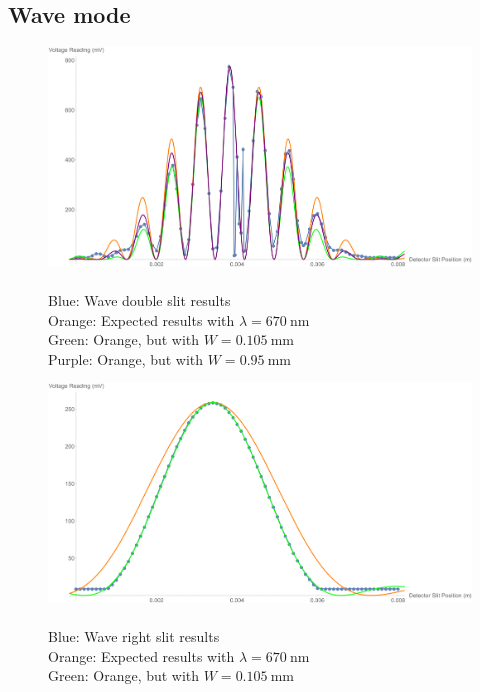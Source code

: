 \documentclass[a4paper]{scrartcl}
\begin{document}
\subsection{Wave mode}
\begin{figure}
    \centering
    \includegraphics[width = 18cm]{wave-double-slit.png}
    \caption{\\
        Blue: Wave double slit results \\
        Orange: Expected results with \(\lambda = \SI{670}{\nano\metre}\) \\
        Green: Orange, but with \(W = \SI{0.105}{\milli\metre}\) \\
        Purple: Orange, but with \(W = \SI{0.95}{\milli\metre}\)
    }
    \label{fig:wave-double-slit}
\end{figure}
\begin{figure}
    \centering
    \includegraphics[width = 18cm]{wave-single-slit.png}
    \caption{\\
        Blue: Wave right slit results \\
        Orange: Expected results with \(\lambda = \SI{670}{\nano\metre}\) \\
        Green: Orange, but with \(W = \SI{0.105}{\milli\metre}\)
    }
    \label{fig:wave-single-slit}
\end{figure}
\end{document}
